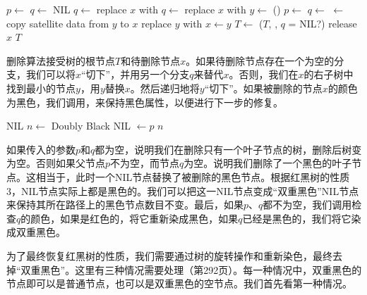 \documentclass[UTF8]{article}
\begin{document}
\begin{algorithmic}[1]
  \State $p \gets$ 
  \State $q \gets$ NIL
    \State $q \gets$ 
    \State replace $x$ with 
    \State $q \gets$ 
    \State replace $x$ with 
  \Else
    \State $y \gets$ ()
    \State $p \gets$ 
    \State $q \gets$ 
    \State {} $\gets$ 
    \State copy satellite data from $y$ to $x$
    \State replace $y$ with 
    \State $x \gets y$
  \EndIf
    \State $T \gets$ ($T$, , $q$ = NIL?)
  \EndIf
  \State release $x$
  \State \Return $T$
\EndFunction
\end{algorithmic}

删除算法接受树的根节点$T$和待删除节点$x$。如果待删除节点存在一个为空的分支，我们可以将$x$“切下”，并用另一个分支$q$来替代$x$。否则，我们在$x$的右子树中找到最小的节点$y$，用$y$替换$x$。然后递归地将$y$“切下”。如果被删除的节点$x$的颜色为黑色，我们调用，来保持黑色属性，以便进行下一步的修复。

\begin{algorithmic}[1]
    \State \Return NIL 
    \State $n \gets$ Doubly Black NIL
    \State {} $\gets p$
    \State \Return $n$
  \Else
    \State \Return {}
  \EndIf
\EndFunction
\end{algorithmic}

如果传入的参数$p$和$q$都为空，说明我们在删除只有一个叶子节点的树，删除后树变为空。否则如果父节点$p$不为空，而节点$q$为空。说明我们删除了一个黑色的叶子节点。这相当于，此时一个NIL节点替换了被删除的黑色节点。根据红黑树的性质3，NIL节点实际上都是黑色的。我们可以把这一NIL节点变成“双重黑色”NIL节点来保持其所在路径上的黑色节点数目不变。最后，如果$p$、$q$都不为空，我们调用检查$q$的颜色，如果是红色的，将它重新染成黑色，如果$q$已经是黑色的，我们将它染成双重黑色。

为了最终恢复红黑树的性质，我们需要通过树的旋转操作和重新染色，最终去掉“双重黑色”。这里有三种情况需要处理（\cite{CLRS}第292页）。每一种情况中，双重黑色的节点即可以是普通节点，也可以是双重黑色的空节点。我们首先看第一种情况。
\end{document}
